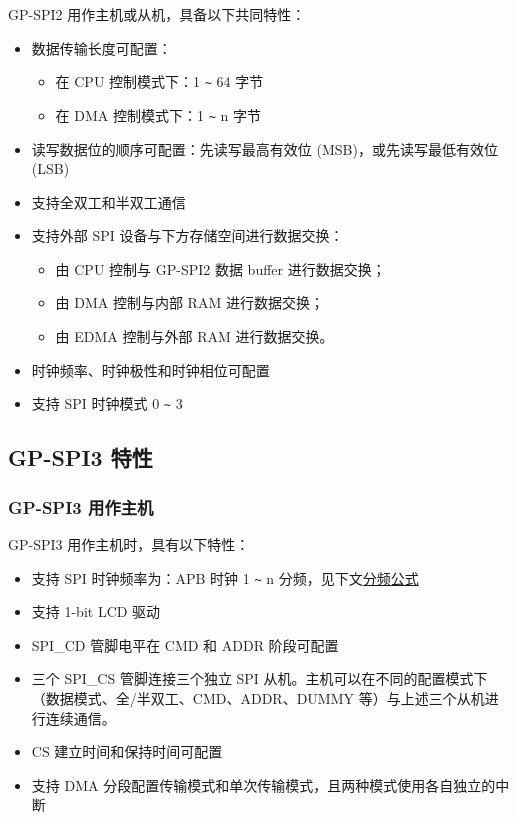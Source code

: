 \documentclass[main\_\_CN.tex]{subfiles}
\begin{document}
GP-SPI2 用作主机或从机，具备以下共同特性：
  \begin{itemize}
    \item 数据传输长度可配置：
    \begin{itemize}
        \item 在 CPU 控制模式下：1 \verb+~+ 64 字节
        \item 在 DMA 控制模式下：1 \verb+~+ n 字节
    \end{itemize}

    \item 读写数据位的顺序可配置：先读写最高有效位 (MSB)，或先读写最低有效位 (LSB)

    \item 支持全双工和半双工通信
    \item 支持外部 SPI 设备与下方存储空间进行数据交换：
      \begin{itemize}
        \item 由 CPU 控制与 GP-SPI2 数据 buffer 进行数据交换；
        \item 由 DMA 控制与内部 RAM 进行数据交换；
        \item 由 EDMA 控制与外部 RAM 进行数据交换。
      \end{itemize}

    \item 时钟频率、时钟极性和时钟相位可配置
    \item 支持 SPI 时钟模式 0 \verb+~+ 3
  \end{itemize}

\subsection{GP-SPI3 特性}

\subsubsection{GP-SPI3 用作主机}

GP-SPI3 用作主机时，具有以下特性：
  \begin{itemize}
    \item 支持 SPI 时钟频率为：APB 时钟 1 \verb+~+ n 分频，见下文\hyperref[division-formula]{分频公式}
    \item 支持 1-bit LCD 驱动
    \item SPI\_CD 管脚电平在 CMD 和 ADDR 阶段可配置
    \item 三个 SPI\_CS 管脚连接三个独立 SPI 从机。主机可以在不同的配置模式下（数据模式、全/半双工、CMD、ADDR、DUMMY 等）与上述三个从机进行连续通信。
    \item CS 建立时间和保持时间可配置
    \item 支持 DMA 分段配置传输模式和单次传输模式，且两种模式使用各自独立的中断
  \end{itemize}
\end{document}
